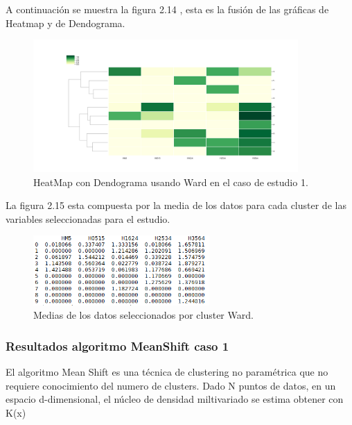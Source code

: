 	A continuación se muestra la figura 2.14 , esta es la fusión de las gráficas de 
	Heatmap y de Dendograma.  \\

	\begin{figure}[htb]
		\centering
		\includegraphics[width=0.9\textwidth]{./imagenes/caso1/heatmapcondendograma_caso1_Ward}
		\caption{HeatMap con Dendograma usando Ward en el caso de estudio 1.} \label{fig:1}
	\end{figure}

	La figura 2.15 esta compuesta por la media de los datos para cada cluster de las variables seleccionadas
	para el estudio. \\ 

	\begin{figure}[htb]
		\centering
		\includegraphics[width=0.6\textwidth]{./imagenes/caso1/medias_datos_caso1_Ward}
		\caption{Medias de los datos seleccionados por cluster Ward.} \label{fig:1}
	\end{figure}


	\subsubsection{Resultados algoritmo MeanShift caso 1}

	El algoritmo Mean Shift es una técnica de clustering no paramétrica que no requiere conocimiento
	del numero de clusters. Dado N puntos de datos, en un espacio d-dimensional, el núcleo de densidad
	miltivariado se estima obtener con K(x) \cite{cite6} \\

